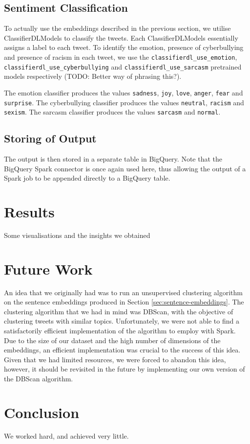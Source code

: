 \documentclass[a4paper,12pt]{article}
\begin{document}
\subsection{Sentiment Classification}
To actually use the embeddings described in the previous section, we utilise ClassifierDLModels\cite{classifier-dl-model} to classify the tweets. Each ClassifierDLModels essentially assigns a label to each tweet. To identify the emotion, presence of cyberbullying and presence of racism in each tweet, we use the \texttt{classifierdl\_use\_emotion}, \texttt{classifierdl\_use\_cyberbullying} and \texttt{classifierdl\_use\_sarcasm} pretrained models respectively ({\color{red}TODO: Better way of phrasing this?}). 

The emotion classifier produces the values \texttt{sadness}, \texttt{joy}, \texttt{love}, \texttt{anger}, \texttt{fear} and \texttt{surprise}. The cyberbullying classifier produces the values \texttt{neutral}, \texttt{racism} and \texttt{sexism}. The sarcasm classifier produces the values \texttt{sarcasm} and \texttt{normal}. 

\subsection{Storing of Output}
The output is then stored in a separate table in BigQuery. Note that the BigQuery Spark connector is once again used here, thus allowing the output of a Spark job to be appended directly to a BigQuery table.

\section{Results}
Some visualisations and the insights we obtained

\section{Future Work}
An idea that we originally had was to run an unsupervised clustering algorithm on the sentence embeddings produced in Section \ref{sec:sentence-embeddings}. The clustering algorithm that we had in mind was DBScan\cite{Ester96adensity-based}, with the objective of clustering tweets with similar topics. Unfortunately, we were not able to find a satisfactorily efficient implementation of the algorithm to employ with Spark. Due to the size of our dataset and the high number of dimensions of the embeddings, an efficient implementation was crucial to the success of this idea. Given that we had limited resources, we were forced to abandon this idea, however, it should be revisited in the future by implementing our own version of the DBScan algorithm.

\section{Conclusion}
We worked hard, and achieved very little.

\nocite{*}



\end{document}
